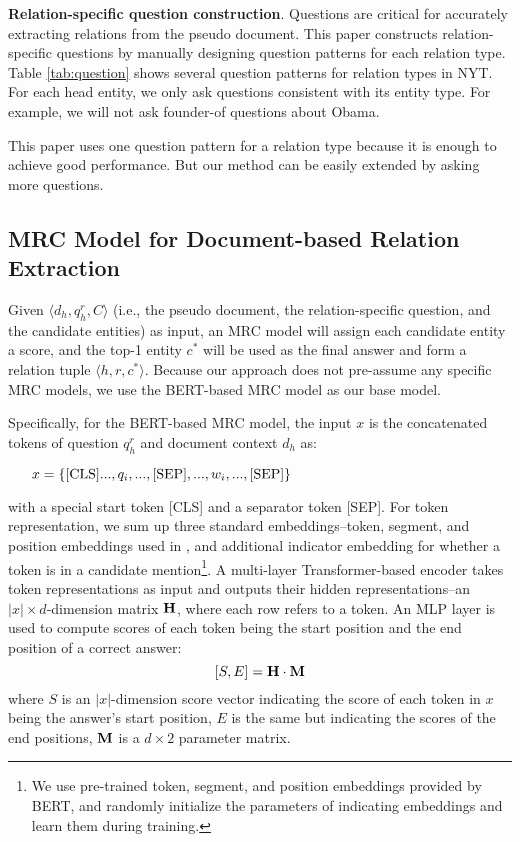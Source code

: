 \documentclass[11pt,a4paper]{article}
\begin{document}
  \textbf{Relation-specific question construction}.
  Questions are critical for accurately extracting relations from the pseudo document.
  This paper constructs relation-specific questions by manually designing question patterns for each relation type.
  Table \ref{tab:question} shows several question patterns for relation types in NYT.
  For each head entity, we only ask questions consistent with its entity type. For example, we will not ask founder-of questions about Obama. 
  
  This paper uses one question pattern for a relation type because it is enough to achieve good performance. But our method can be easily extended by asking more questions.
  
  \subsection{MRC Model for Document-based Relation Extraction}
  Given $\langle d_h, q_h^r, C\rangle$ (i.e., the pseudo document, the relation-specific question, and the candidate entities) as input, an MRC model will assign each candidate entity a score, and the top-1 entity $c^*$ will be used as the final answer and form a relation tuple $\langle h, r, c^*\rangle$.
  Because our approach does not pre-assume any specific MRC models,
  we use the BERT-based MRC model \cite{devlin_bert_2019} as our base model.
  
  Specifically,  for the BERT-based MRC model, the input $x$ is the concatenated tokens of question $q_h^r$ and document context $d_h$ as:
  
  \noindent $\centering \ \ \ \ \ x = \{[\text{CLS}]..., q_i,..., [\text{SEP}], ..., w_i,..., [\text{SEP}]\}$
  
  \noindent with a special start token [CLS] and a separator token [SEP].
  For token representation, we sum up three standard embeddings--token, segment, and position embeddings used in \citet{devlin_bert_2019}, and additional indicator embedding for whether a token is in a candidate mention\footnote{We use pre-trained token, segment, and position embeddings provided by BERT, and randomly initialize the parameters of indicating embeddings and learn them during training.}.
  A multi-layer Transformer-based \cite{vaswani_attention_2017} encoder takes token representations as input and outputs their hidden representations--an $|x| \times d$-dimension matrix $\bm{{\rm H}}$, where each row refers to a token.
  An MLP layer is used to compute scores of each token being the start position and the end position of a correct answer:
  \begin{equation}
    \setlength{\abovedisplayskip}{4pt}
    \setlength{\belowdisplayskip}{4pt}
    [S, E] = \bm{{\rm H}} \cdot \bm{{\rm M}} 
  \end{equation}
  \noindent where $S$ is an $|x|$-dimension score vector indicating the score of each token in $x$ being the answer's start position, 
  $E$ is the same but indicating the scores of the end positions, $\bm{{\rm M}}$ is a $d \times 2$ parameter matrix.
  
\end{document}

